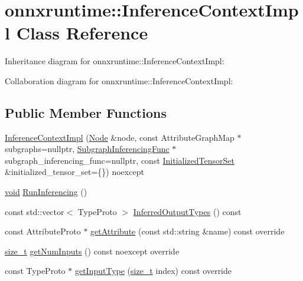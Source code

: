 \hypertarget{classonnxruntime_1_1InferenceContextImpl}{}\section{onnxruntime\+:\+:Inference\+Context\+Impl Class Reference}
\label{classonnxruntime_1_1InferenceContextImpl}


Inheritance diagram for onnxruntime\+:\+:Inference\+Context\+Impl\+:


Collaboration diagram for onnxruntime\+:\+:Inference\+Context\+Impl\+:
\subsection*{Public Member Functions}
\begin{DoxyCompactItemize}
\item 
\mbox{\hyperlink{classonnxruntime_1_1InferenceContextImpl_a20ba0c93f6fcb52e31f4dfbbb4f3da28}{Inference\+Context\+Impl}} (\mbox{\hyperlink{classonnxruntime_1_1Node}{Node}} \&node, const Attribute\+Graph\+Map $\ast$subgraphs=nullptr, \mbox{\hyperlink{namespaceonnxruntime_ae184f68a858158d9595f3fe260b05dfb}{Subgraph\+Inferencing\+Func}} $\ast$subgraph\+\_\+inferencing\+\_\+func=nullptr, const \mbox{\hyperlink{namespaceonnxruntime_a80c06ce917adca79f4a9c0f9ad3147f8}{Initialized\+Tensor\+Set}} \&initialized\+\_\+tensor\+\_\+set=\{\}) noexcept
\item 
\mbox{\hyperlink{mlasi_8h_a88f941d423cb2a819b70a1358982b1a6}{void}} \mbox{\hyperlink{classonnxruntime_1_1InferenceContextImpl_a03867e44217366769507abf47d0a237d}{Run\+Inferencing}} ()
\item 
const std\+::vector$<$ Type\+Proto $>$ \mbox{\hyperlink{classonnxruntime_1_1InferenceContextImpl_a676796a4ac3f6c6fb523d39b4945c4a1}{Inferred\+Output\+Types}} () const
\item 
const Attribute\+Proto $\ast$ \mbox{\hyperlink{classonnxruntime_1_1InferenceContextImpl_ae88965a10d7827fc364d9ca3717c4754}{get\+Attribute}} (const std\+::string \&name) const override
\item 
\mbox{\hyperlink{mlasi_8h_a503efbc1c6e50825320ad909366b78ab}{size\+\_\+t}} \mbox{\hyperlink{classonnxruntime_1_1InferenceContextImpl_a746e9bef7556f5396035691aee180fe1}{get\+Num\+Inputs}} () const noexcept override
\item 
const Type\+Proto $\ast$ \mbox{\hyperlink{classonnxruntime_1_1InferenceContextImpl_af2af6aa91a8dbdb477866da91856cbca}{get\+Input\+Type}} (\mbox{\hyperlink{mlasi_8h_a503efbc1c6e50825320ad909366b78ab}{size\+\_\+t}} index) const override

\end{DoxyCompactItemize}
